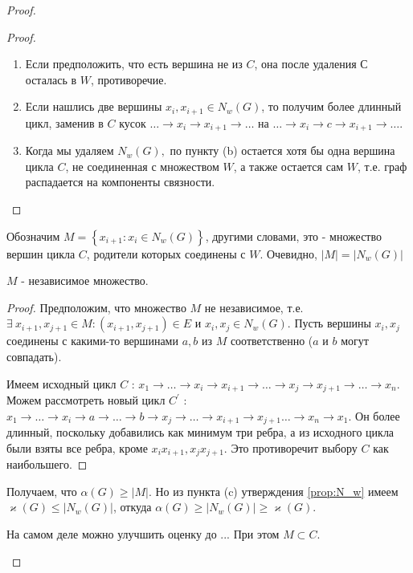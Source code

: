 \begin{proof}
\begin{enumerate}
\begin{prop}
		\end{prop}
		
		\begin{proof}
			\:
			\begin{enumerate} \renewcommand{\theenumi}{\arabic{enumi}}
				\item Если предположить, что есть вершина не из $ C $, она после удаления $ С $ осталась в $ W $, противоречие.
				\item Если нашлись две вершины $ x_i, x_{i + 1} \in N_w(G) $, то получим более длинный цикл, заменив в $ C $ кусок $\dots \rightarrow x_i \rightarrow x_{i + 1} \rightarrow \dots$ на $ \dots \rightarrow x_i \rightarrow c \rightarrow x_{i + 1} \rightarrow \dots$.
				\item Когда мы удаляем $ N_w(G), $ по пункту (b) остается хотя бы одна вершина цикла $ C $, не соединенная с множеством $ W $, а также остается сам $ W $, т.е. граф распадается на компоненты связности.
			\end{enumerate}
		\end{proof}
		Обозначим $ M = \left\lbrace x_{i + 1} : x_i \in N_w(G)\right\rbrace $, другими словами, это - множество вершин цикла $ C $, родители которых соединены с $ W $. Очевидно, $ |M| = |N_w(G)| $
		\begin{prop}
			$ M $ - независимое множество.
		\end{prop}
		\begin{proof}
			Предположим, что множество $ M $ не независимое, т.е. $ \exists\: x_{i + 1}, x_{j + 1} \in M : (x_{i + 1}, x_{j + 1}) \in E $ и $ x_i, x_j \in N_w(G) $. Пусть вершины $ x_{i}, x_{j} $ соединены с какими-то вершинами $ a, b $ из $ M $ соответственно ($ a $ и $ b $ могут совпадать).
			
			
			Имеем исходный цикл $ C $ : $x_1 \rightarrow \dots \rightarrow x_i \rightarrow x_{i + 1} \rightarrow \dots \rightarrow x_j \rightarrow x_{j + 1} \rightarrow \dots \rightarrow x_n$. Можем рассмотреть новый цикл $ C^\prime $ :
			$x_1 \rightarrow \dots \rightarrow x_i \rightarrow a \rightarrow \dots \rightarrow b \rightarrow x_j \rightarrow \ldots \rightarrow x_{i + 1} \rightarrow x_{j + 1} \dots \rightarrow x_n \rightarrow x_1$. Он более длинный, поскольку добавились как минимум три ребра, а из исходного цикла были взяты все ребра, кроме $ x_ix_{i + 1}, x_jx_{j + 1} $. Это противоречит выбору $ C $ как наибольшего.
			
		\end{proof}
		Получаем, что $ \alpha(G) \geqslant |M|$. Но из пункта (c) утверждения \ref{prop:N_w} имеем $ \varkappa(G) \leqslant |N_w(G)| $, откуда $ \alpha(G) \geqslant  |N_w(G)| \geqslant \varkappa(G) $.
		
		\begin{note}
			 На самом деле можно улучшить оценку до ... При этом $ M \subset C $.
		\end{note}
			
	\end{enumerate}
\end{proof}

